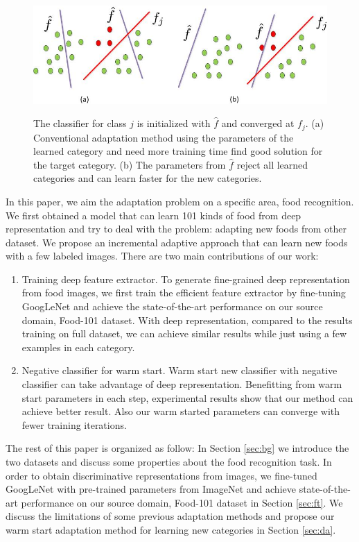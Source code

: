 \begin{figure}
  \centering
  \includegraphics[scale = .6]{fig/domain2.jpg}\\
  \caption{The classifier for class $j$ is initialized with $\hat{f}$ and converged at $f_j$. (a) Conventional adaptation method using the parameters of the learned category and need more training time find good solution for the target category. (b) The parameters from $\hat{f}$ reject all learned categories and can learn faster for the new categories.}
  \label{fig:wm}
\end{figure}

In this paper, we aim the adaptation problem on a specific area, food recognition. We first obtained a model that can learn 101 kinds of food from deep representation and try to deal with the problem: adapting new foods from other dataset. We propose an incremental adaptive approach that can learn new foods with a few labeled images. There are two main contributions of our work:
\begin{enumerate}
  \item Training deep feature extractor. To generate fine-grained deep representation from food images, we first train the efficient feature extractor by fine-tuning GoogLeNet and achieve the state-of-the-art performance on our source domain, Food-101 dataset. With deep representation, compared to the results training on full dataset, we can achieve similar results while just using a few examples in each category.
  \item Negative classifier for warm start. Warm start new classifier with negative classifier can take advantage of deep representation. Benefitting from warm start parameters in each step, experimental results show that our method can achieve better result. Also our warm started parameters can converge with fewer training iterations.
\end{enumerate}

The rest of this paper is organized as follow: In Section \ref{sec:bg} we introduce the two datasets and discuss some properties about the food recognition task. In order to obtain discriminative representations from images, we fine-tuned GoogLeNet with pre-trained parameters from ImageNet and achieve state-of-the-art performance on our source domain, Food-101 dataset in Section \ref{sec:ft}. We discuss the limitations of some previous adaptation methods and propose our warm start adaptation method for learning new categories in Section \ref{sec:da}.
